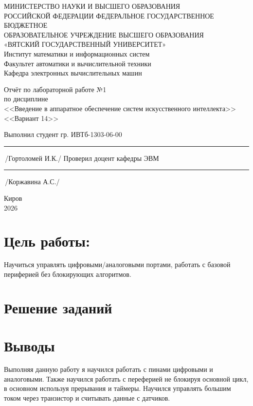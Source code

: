 \documentclass[oneside,a4paper,14pt]{extarticle} %
\begin{document}
	\newpage\thispagestyle{empty}
	\begin{center}
		МИНИСТЕРСТВО НАУКИ И ВЫСШЕГО ОБРАЗОВАНИЯ\\
			РОССИЙСКОЙ ФЕДЕРАЦИИ
			ФЕДЕРАЛЬНОЕ ГОСУДАРСТВЕННОЕ БЮДЖЕТНОЕ\\
			ОБРАЗОВАТЕЛЬНОЕ
			УЧРЕЖДЕНИЕ ВЫСШЕГО ОБРАЗОВАНИЯ\\
			«ВЯТСКИЙ ГОСУДАРСТВЕННЫЙ УНИВЕРСИТЕТ»\\
			Институт математики и информационных систем\\
			Факультет автоматики и вычислительной техники\\
			Кафедра электронных вычислительных машин
	\end{center}
	\vspace{20mm}

	\begin{center}
		Отчёт по лабораторной работе №1\\
		по дисциплине\\
		<<Введение в аппаратное обеспечение систем искусственного интеллекта>>\\
		<<Вариант 14>>\\
	\end{center}
	\vspace{48mm}

	\noindent
	Выполнил студент гр. ИВТб-1303-06-00 \hfill \rule[-0,5mm]{30mm}{0.15mm}\,/Гортоломей И.К./
	\newline
	Проверил доцент кафедры ЭВМ \hfill \rule[-0,5mm]{30mm}{0.15mm}\,/Коржавина А.С./

	\vfill
	\begin{center}
		Киров\\
		2026
	\end{center}

	\newpage
	\thispagestyle{empty}

	\section*{Цель работы:} Научиться управлять цифровыми/аналоговыми портами, работать с базовой периферией без блокирующих алгоритмов.
	\section*{Решение заданий}
	
	\section*{Выводы} Выполняя данную работу я научился работать с пинами цифровыми и аналоговыми. Также научился работать с переферией не блокируя основной цикл, в основном используя прерывания и таймеры. Научился управлять большим током через транзистор и считывать данные с датчиков.
\end{document}
